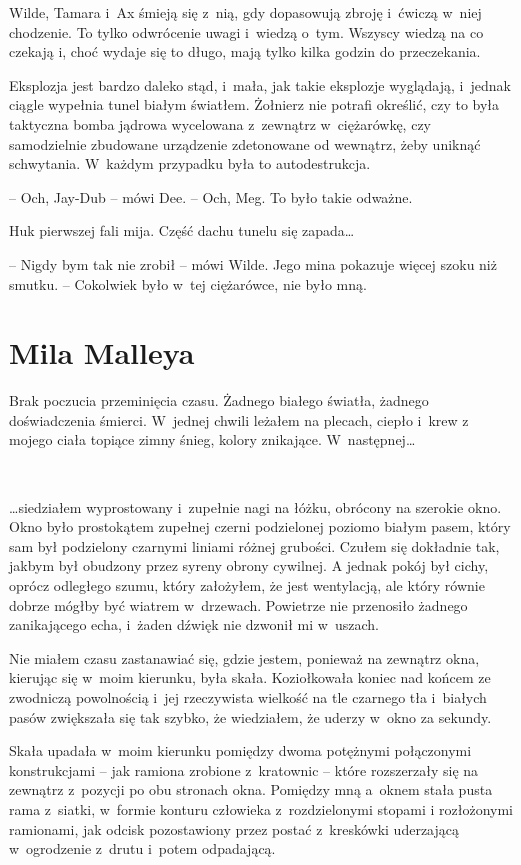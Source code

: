 \documentclass[oneside,polish,11pt,sfheadings]{mwbk}
\begin{document}
Wilde, Tamara i~Ax śmieją się z~nią, gdy dopasowują zbroję i~ćwiczą w~niej chodzenie. To tylko odwrócenie uwagi i~wiedzą o~tym. Wszyscy wiedzą
na co czekają i, choć wydaje się to długo, mają tylko kilka godzin do
przeczekania.

Eksplozja jest bardzo daleko stąd, i~mała, jak takie eksplozje
wyglądają, i~jednak ciągle wypełnia tunel białym światłem. Żołnierz nie
potrafi określić, czy to była taktyczna bomba jądrowa wycelowana z~zewnątrz w~ciężarówkę, czy samodzielnie zbudowane urządzenie zdetonowane
od wewnątrz, żeby uniknąć schwytania. W~każdym przypadku była to
autodestrukcja.

-- Och, Jay-Dub -- mówi Dee. -- Och, Meg. To było takie odważne.

Huk pierwszej fali mija. Część dachu tunelu się zapada\ldots

-- Nigdy bym tak nie zrobił -- mówi Wilde. Jego mina pokazuje więcej szoku
niż smutku. -- Cokolwiek było w~tej ciężarówce, nie było mną.

\chapter{Mila Malleya}
Brak poczucia przeminięcia czasu. Żadnego białego światła, żadnego
doświadczenia śmierci. W~jednej chwili leżałem na plecach, ciepło i~krew
z mojego ciała topiące zimny śnieg, kolory znikające. W~następnej\ldots

~

\ldots siedziałem wyprostowany i~zupełnie nagi na łóżku, obrócony na szerokie
okno. Okno było prostokątem zupełnej czerni podzielonej poziomo białym
pasem, który sam był podzielony czarnymi liniami różnej grubości. Czułem
się dokładnie tak, jakbym był obudzony przez syreny obrony cywilnej. A
jednak pokój był cichy, oprócz odległego szumu, który założyłem, że jest
wentylacją, ale który równie dobrze mógłby być wiatrem w~drzewach.
Powietrze nie przenosiło żadnego zanikającego echa, i~żaden dźwięk nie
dzwonił mi w~uszach.

Nie miałem czasu zastanawiać się, gdzie jestem, ponieważ na zewnątrz
okna, kierując się w~moim kierunku, była skała. Koziołkowała koniec nad
końcem ze zwodniczą powolnością i~jej rzeczywista wielkość na tle
czarnego tła i~białych pasów zwiększała się tak szybko, że wiedziałem,
że uderzy w~okno za sekundy.

Skała upadała w~moim kierunku pomiędzy dwoma potężnymi połączonymi
konstrukcjami -- jak ramiona zrobione z~kratownic -- które rozszerzały się
na zewnątrz z~pozycji po obu stronach okna. Pomiędzy mną a~oknem stała
pusta rama z~siatki, w~formie konturu człowieka z~rozdzielonymi stopami
i rozłożonymi ramionami, jak odcisk pozostawiony przez postać z~kreskówki uderzającą w~ogrodzenie z~drutu i~potem odpadającą.
\end{document}
